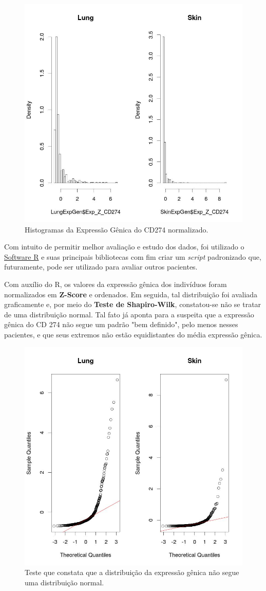 \documentclass[a4paper,12pt]{article}
\begin{document}
\begin{figure}[h!]
\centering
\includegraphics[width=0.7 \textwidth]{plot_histograma2.jpeg}
\caption{Histogramas da Expressão Gênica do CD274 normalizado.}
\label{fig:Hist2}
\end{figure}

Com intuito de permitir melhor avaliação e estudo dos dados, foi utilizado o \href{https://www.r-project.org/}{Software R} e suas principais bibliotecas com fim criar um \textit{script} padronizado que, futuramente, pode ser utilizado para avaliar outros pacientes.


Com auxílio do R, os valores da expressão gênica dos indivíduos foram normalizados em \textbf{Z-Score} e ordenados. Em seguida, tal distribuição foi avaliada graficamente e, por meio do \textbf{Teste de Shapiro-Wilk}, constatou-se não se tratar de uma distribuição normal. Tal fato já aponta para a suspeita que a expressão gênica do CD 274 não segue um padrão "bem definido", pelo menos nesses pacientes, e que seus extremos não estão equidistantes do média expressão gênica.

\begin{figure}[h!]
\centering
\includegraphics[width=0.5 \textwidth]{plot_testeNorm.jpeg}
\caption{Teste que constata que a distribuição da expressão gênica não segue uma distribuição normal.}
\label{fig:TesteNorm}
\end{figure}
\end{document}
